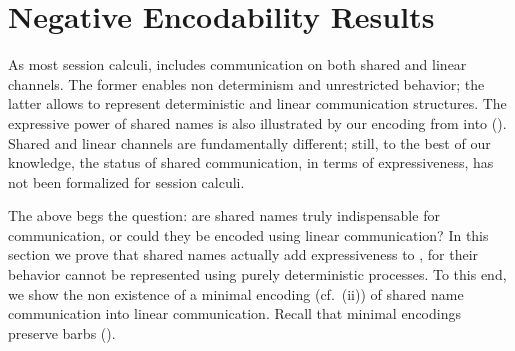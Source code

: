\section{Negative Encodability Results}
	\label{s:negative}
	\label{sec:negative}

%

As most session calculi, 
\HOp includes communication on both shared and linear channels.
The former enables non determinism and unrestricted behavior; the latter allows to represent
deterministic and linear communication structures.
The expressive power of shared names is also illustrated by our 
encoding from \HOp into \sessp ().
Shared and linear channels are fundamentally different; still, to the best of our knowledge,
the status of shared communication, in terms of expressiveness, has not been formalized for session calculi.

The above begs the question: are shared names truly indispensable for communication, or could they
be encoded using linear communication?
In this section we prove that shared names actually add expressiveness to \HOp,
for their behavior cannot be represented using purely deterministic processes.
To this end, we show the non existence of a minimal encoding 
(cf.~(ii))
of shared name communication into linear 
communication. Recall that minimal encodings preserve barbs ().

%
%
%



